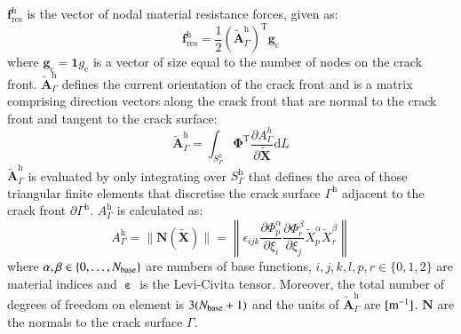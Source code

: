 \documentclass[review]{elsarticle}
\numberwithin{equation}{section}
\begin{document}
$\mathbf{f}^\textrm{h}_\textrm{res}$ is the vector of nodal material resistance forces, given as:
\begin{equation}
\mathbf{f}^\textrm{h}_\textrm{res}=\frac{1}{2}\left(\tilde{\mathbf{A}}_\Gamma^\textrm{h}\right)^\textrm{T}\mathbf{g}_\textrm{c}
\end{equation}
where $\mathbf{g}_\textrm{c}=\mathbf{1}g_\textrm{c}$ is a vector of size equal to the number of nodes on the crack front. $\tilde{\mathbf{A}}_\Gamma^\textrm{h}$ defines the current orientation of the crack front and is a matrix comprising direction vectors along the crack front that are normal to the crack front and tangent to the crack surface:
\begin{equation}
\tilde{\mathbf{A}}_\Gamma^\textrm{h} = 
\int_{S^h_\Gamma}
\pmb{\Phi}^\textrm{T} 
\frac{\partial {A}^h_{\Gamma}}{
\partial \tilde{\mathbf{X}}}
\textrm{d}L
\end{equation}
$\tilde{\mathbf{A}}_\Gamma^\textrm{h}$ is evaluated by only integrating over $S_\Gamma^\textrm{h}$ that defines the area of those triangular finite elements that discretise the crack surface $\Gamma^\textrm{h}$ adjacent to the crack front $\partial\Gamma^\textrm{h}$.
$A^\textrm{h}_{\Gamma}$ is calculated as:
\begin{equation}
A^\textrm{h}_{\Gamma} = 	
	\| \mathbf{N}(\tilde{\mathbf{X}}) \|
=
\left\| 
\epsilon_{ijk}
\frac{\partial \Phi^\alpha_p}{\partial \xi_i}  
\frac{\partial \Phi^\beta_r}{\partial \xi_j} 
\tilde{X}^\alpha_p
\tilde{X}^\beta_r
\right\|
\end{equation}
where $\alpha, \beta \in \{0, \dots, N_{\rm{base}}\}$ are numbers of base functions,
$i,j,k,l,p,r \in \{0,1,2\}$ are material indices and $\boldsymbol{\upepsilon}$ is the Levi-Civita tensor. 
Moreover, the total number of degrees of freedom on element is $3(N_{\rm{base}}+1)$ and the units of $\tilde{\mathbf{A}}_\Gamma^\textrm{h}$ are $[{\rm m}^{-1}]$. $\mathbf{N}$ are the normals to the crack surface $\Gamma$.




\end{document}
